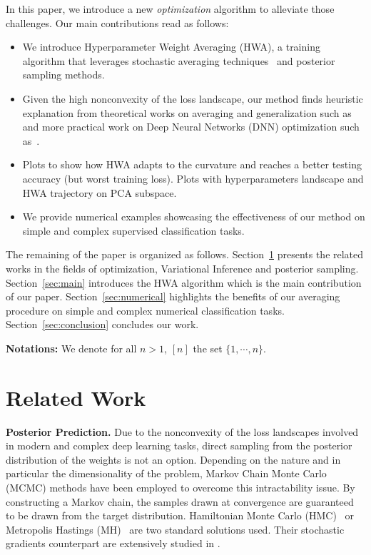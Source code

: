 \documentclass{article} %
\begin{document}
In this paper, we introduce a new \emph{optimization} algorithm to alleviate those challenges.
Our main contributions read as follows:
\begin{itemize}
\item We introduce Hyperparameter Weight Averaging (HWA), a training algorithm that leverages stochastic averaging techniques~\citep{polyak1992acceleration} and posterior sampling methods.
\item Given the high nonconvexity of the loss landscape, our method finds heuristic explanation from theoretical works on averaging and generalization such as~\citep{keskar2016large,he2019asymmetric} and more practical work on Deep Neural Networks (DNN) optimization such as~\citep{izmailov2018averaging}.

\item {\color{red} Plots to show how HWA adapts to the curvature and reaches a better testing accuracy (but worst training loss). Plots with hyperparameters landscape and HWA trajectory on PCA subspace.}

\item We provide numerical examples showcasing the effectiveness of our method on simple and complex supervised classification tasks.
\end{itemize}

The remaining of the paper is organized as follows.
Section~\ref{sec:related} presents the related works in the fields of optimization, Variational Inference and posterior sampling.
Section~\ref{sec:main} introduces the HWA algorithm which is the main contribution of our paper.
Section~\ref{sec:numerical} highlights the benefits of our averaging procedure on simple and complex numerical classification tasks.
Section~\ref{sec:conclusion} concludes our work.

\textbf{Notations:} We denote for all $n >1$, $[n]$ the set $ \{1, \cdots, n\}$.
 
\section{Related Work}\label{sec:related}
\textbf{Posterior Prediction.}
Due to the nonconvexity of the loss landscapes involved in modern and complex deep learning tasks, direct sampling from the posterior distribution of the weights is not an option.
Depending on the nature and in particular the dimensionality of the problem, Markov Chain Monte Carlo (MCMC) methods have been employed to overcome this intractability issue.
By constructing a Markov chain, the samples drawn at convergence are guaranteed to be drawn from the target distribution.
Hamiltonian Monte Carlo (HMC)~\citep{neal2011mcmc} or Metropolis Hastings (MH)~\citep{hastings1970monte} are two standard solutions used.
Their stochastic gradients counterpart are extensively studied in \citep{ma2015complete}.
\end{document}
